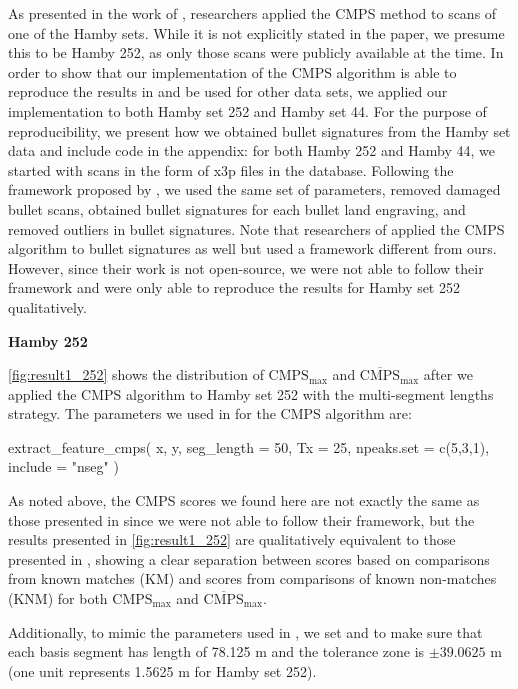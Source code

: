 As presented in the work of \citet{cmps}, researchers applied the CMPS
method to scans of one of the Hamby sets. While it is not explicitly
stated in the paper, we presume this to be Hamby 252, as only those
scans were publicly available at the time. In order to show that our
implementation of the CMPS algorithm is able to reproduce the results in
\citet{cmps} and be used for other data sets, we applied our
implementation to both Hamby set 252 and Hamby set 44. For the purpose
of reproducibility, we present how we obtained bullet signatures from
the Hamby set data and include code in the appendix: for both Hamby 252
and Hamby 44, we started with scans in the form of x3p files in the
database. Following the framework proposed by \citet{aoas}, we used the
same set of parameters, removed damaged bullet scans, obtained bullet
signatures for each bullet land engraving, and removed outliers in
bullet signatures. Note that researchers of \citet{cmps} applied the
CMPS algorithm to bullet signatures as well but used a framework
different from ours. However, since their work is not open-source, we
were not able to follow their framework and were only able to reproduce
the results for Hamby set 252 qualitatively.

\textbf{Hamby 252}

\autoref{fig:result1_252} shows the distribution of
\(\mathrm{CMPS_{max}}\) and \(\mathrm{\overline{CMPS}_{max}}\) after we
applied the CMPS algorithm to Hamby set 252 with the multi-segment
lengths strategy. The parameters we used in
 for the CMPS algorithm are:

\begin{Schunk}
\begin{Sinput}
extract_feature_cmps(
  x, y,
  seg_length = 50,
  Tx = 25,
  npeaks.set = c(5,3,1),
  include = "nseg"
)
\end{Sinput}
\end{Schunk}

As noted above, the CMPS scores we found here are not exactly the same
as those presented in \citet{cmps} since we were not able to follow
their framework, but the results presented in \autoref{fig:result1_252}
are qualitatively equivalent to those presented in \citet{cmps}, showing
a clear separation between scores based on comparisons from known
matches (KM) and scores from comparisons of known non-matches (KNM) for
both \(\mathrm{CMPS_{max}}\) and \(\mathrm{\overline{CMPS}_{max}}\).

Additionally, to mimic the parameters used in \citet{cmps}, we set
 and  to make sure that each basis
segment has length of 78.125 \textmu m and the tolerance zone is
\(\pm 39.0625\) \textmu m (one unit represents 1.5625 \textmu m for
Hamby set 252).

